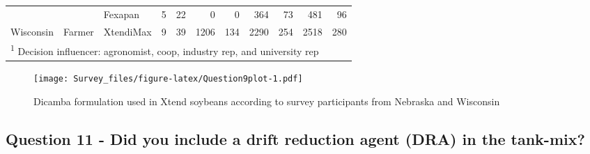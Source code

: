 \documentclass[]{article}
\begin{document}
\begin{landscape}
\begin{table}[!h]
\begin{tabular}[t]{lllrrrrrrrr}
 &  & Fexapan & 5 & 22 & 0 & 0 & 364 & 73 & 481 & 96\\

\multirow{-6}{*}{\raggedright\arraybackslash Wisconsin} & \multirow{-3}{*}{\raggedright\arraybackslash Farmer} & XtendiMax & 9 & 39 & 1206 & 134 & 2290 & 254 & 2518 & 280\\
\bottomrule
\multicolumn{11}{l}{\textsuperscript{1} Decision influencer: agronomist, coop, industry rep, and university rep}\\
\end{tabular}
\end{table}
\end{landscape}

\begin{figure}
\centering
\texttt{[image: Survey\_files/figure-latex/Question9plot-1.pdf]}
\caption{Dicamba formulation used in Xtend soybeans according to survey
participants from Nebraska and Wisconsin}
\end{figure}

\newpage

\subsection{Question 11 - Did you include a drift reduction agent (DRA)
in the
tank-mix?}\label{question-11---did-you-include-a-drift-reduction-agent-dra-in-the-tank-mix}
\end{document}
